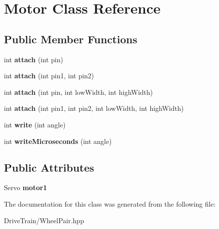 \hypertarget{class_motor}{}\section{Motor Class Reference}
\label{class_motor}
\subsection*{Public Member Functions}
\begin{DoxyCompactItemize}
\item 
\mbox{\label{class_motor_a288fa8c4219000a1e979b62a69de70f6}} 
int {\bfseries attach} (int pin)
\item 
\mbox{\label{class_motor_a0cffaa206e604b6bf9edc5f18a847bdf}} 
int {\bfseries attach} (int pin1, int pin2)
\item 
\mbox{\label{class_motor_abc781d4bada1e3357a156d091d798a52}} 
int {\bfseries attach} (int pin, int low\+Width, int high\+Width)
\item 
\mbox{\label{class_motor_a10900b4529c62a616edb5516083637c9}} 
int {\bfseries attach} (int pin1, int pin2, int low\+Width, int high\+Width)
\item 
\mbox{\label{class_motor_a04d9c6fb69f3b314e773d14a4f403611}} 
int {\bfseries write} (int angle)
\item 
\mbox{\label{class_motor_a05fc74e78a04ac1518a78016cf73405c}} 
int {\bfseries write\+Microseconds} (int angle)
\end{DoxyCompactItemize}
\subsection*{Public Attributes}
\begin{DoxyCompactItemize}
\item 
\mbox{\label{class_motor_a81cd7c05cc4e00bede785ba1fec856b7}} 
Servo {\bfseries motor1}
\end{DoxyCompactItemize}


The documentation for this class was generated from the following file\+:\begin{DoxyCompactItemize}
\item 
Drive\+Train/Wheel\+Pair.\+hpp\end{DoxyCompactItemize}
